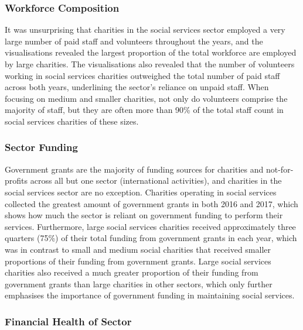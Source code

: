 \documentclass[
  11pt,
]{article}
\begin{document}
\hypertarget{workforce-composition-1}{%
\subsubsection{Workforce Composition}\label{workforce-composition-1}}

It was unsurprising that charities in the social services sector employed a very large number of paid staff and volunteers throughout the years, and the visualisations revealed the largest proportion of the total workforce are employed by large charities. The visualisations also revealed that the number of volunteers working in social services charities outweighed the total number of paid staff across both years, underlining the sector's reliance on unpaid staff. When focusing on medium and smaller charities, not only do volunteers comprise the majority of staff, but they are often more than 90\% of the total staff count in social services charities of these sizes.

\hypertarget{sector-funding-1}{%
\subsubsection{Sector Funding}\label{sector-funding-1}}

Government grants are the majority of funding sources for charities and not-for-profits across all but one sector (international activities), and charities in the social services sector are no exception. Charities operating in social services collected the greatest amount of government grants in both 2016 and 2017, which shows how much the sector is reliant on government funding to perform their services. Furthermore, large social services charities received approximately three quarters (75\%) of their total funding from government grants in each year, which was in contrast to small and medium social charities that received smaller proportions of their funding from government grants. Large social services charities also received a much greater proportion of their funding from government grants than large charities in other sectors, which only further emphasises the importance of government funding in maintaining social services.

\hypertarget{financial-health-of-sector-1}{%
\subsubsection{Financial Health of Sector}\label{financial-health-of-sector-1}}
\end{document}

